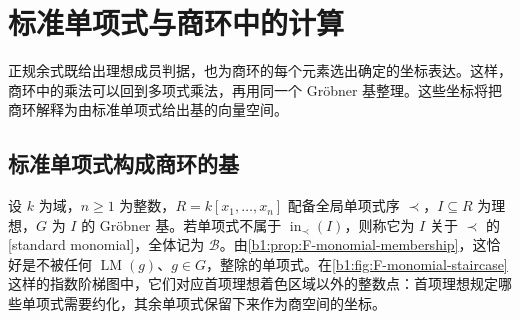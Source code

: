 

\section{标准单项式与商环中的计算}
\label{b1:sec:F05}

正规余式既给出理想成员判据，也为商环的每个元素选出确定的坐标表达。这样，商环中的乘法可以回到多项式乘法，再用同一个 Gröbner 基整理。这些坐标将把商环解释为由标准单项式给出基的向量空间。

\subsection{标准单项式构成商环的基}
\label{b1:subsec:F05:01}

设 \(k\) 为域，\(n\geq1\) 为整数，\(R=k[x_1,\ldots,x_n]\) 配备全局单项式序 \(\prec\)，\(I\subseteq R\) 为理想，\(G\) 为 \(I\) 的 Gröbner 基。若单项式不属于 \(\operatorname{in}_{\prec}(I)\)，则称它为 \(I\) 关于 \(\prec\) 的[standard monomial]，全体记为 \(\mathcal B\)。由\cref{b1:prop:F-monomial-membership}，这恰好是不被任何 \(\operatorname{LM}(g)\)、\(g\in G\)，整除的单项式。在\cref{b1:fig:F-monomial-staircase}这样的指数阶梯图中，它们对应首项理想着色区域以外的整数点：首项理想规定哪些单项式需要约化，其余单项式保留下来作为商空间的坐标。

